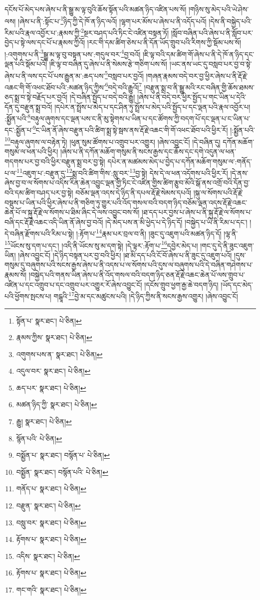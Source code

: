 དངོས་པོ་མེད་པས་ཞེས་པ་ནི་སྒྱུ་མ་ལྟ་བུའི་ཆོས་སྟོན་པའི་མཚན་ཉིད་འཛིན་པས་སོ། །གཉིས་སུ་མེད་པའི་ཡེ་ཤེས་ལས། །ཞེས་པ་ནི་:སྟོང་པ་\footnote{སྟོན་པ་  སྣར་ཐང་།  པེ་ཅིན། }ཉིད་ཀྱི་དེ་ཁོ་ན་ཉིད་ལའོ། །ལྷག་པར་མོས་པ་ཞེས་པ་ནི་འདོད་པའོ། །དེས་ནི་བསྐྱེད་པའི་རིམ་པའི་རྣལ་འབྱོར་པ་:རྣམས་ཀྱི་\footnote{རྣམས་ཀྱིས་  སྣར་ཐང་།  པེ་ཅིན། }སྔར་བཤད་པའི་ཏིང་ངེ་འཛིན་བསྟན་ཏོ། །སློབ་བཞིན་པའི་ཞེས་པ་ནི་སློབ་པར་བྱེད་པ་སྟེ་ལས་དང་པོ་པ་རྣམས་ཀྱིའོ། །རང་གི་དམ་ཚིག་ཅེས་པ་ནི་དོན་ཡོད་གྲུབ་པའི་རིགས་ཀྱི་སྡོམ་པས་སོ། །:འགུགས་པ་ནི་\footnote{འགུགས་པས་ན་  སྣར་ཐང་།  པེ་ཅིན། }སྒྱུ་མ་ལྟ་བུ་བསྟན་པས་:གདུལ་བར་\footnote{འདུལ་བར་  སྣར་ཐང་།  པེ་ཅིན། }བྱ་བའོ། །ཇི་ལྟ་བའི་དམ་ཚིག་གོ་ཞེས་པ་ནི་དེ་ཁོ་ན་ཉིད་དང་ལྡན་པའི་སྡོམ་པའོ། །ཇི་ལྟ་བ་བཞིན་དུ་ཞེས་པ་ནི་སེམས་རྩེ་གཅིག་པས་སོ། །ཡང་ནས་ཡང་དུ་བསླབ་པར་བྱ་བ་སྟེ་ཞེས་པ་ནི་ལས་དང་པོ་པས་རྒྱུན་མ་:ཆད་པས་\footnote{ཆད་པར་  སྣར་ཐང་།  པེ་ཅིན། }བསླབ་པར་བྱའོ། །གཞན་རྣམས་བདེ་བར་བྱ་ཕྱིར་ཞེས་པ་ནི་རྡོ་རྗེ་འཆང་གི་གོ་འཕང་ཐོབ་པའི་:མཚན་ཉིད་ཀྱིས་\footnote{མཚན་ཉིད་ཀྱི་  སྣར་ཐང་།  པེ་ཅིན། }བདེ་བའི་རྒྱུའོ།\footnote{རྒྱུ།  སྣར་ཐང་།  པེ་ཅིན། } །བརྫུན་སྨྲ་བ་ནི་སྒྱུ་མའི་རང་བཞིན་གྱི་ཆོས་ཐམས་ཅད་སྨྲ་བ་སྟེ་བརྗོད་པར་བྱའོ། །དེ་བཞིན་སྤྱོད་པ་བདེ་བའི་རྒྱུ། །ཞེས་པ་ནི་བདེ་བར་ཕྱིར་སྤྱོད་པ་གང་ཡིན་པ་དེའི་དོན་དུ་བརྫུན་སྨྲ་བའོ། །དཔེར་ན་སྤྲོས་པ་མེད་པ་དང་ཤིན་ཏུ་སྤྲོས་པ་མེད་པའི་སྤྱོད་པ་དང་ལྡན་པའི་རྣལ་འབྱོར་པ། :སྨྱོན་པའི་\footnote{སྙོན་པའི་  པེ་ཅིན། }བརྟུལ་ཞུགས་དང་ལྡན་པས་ང་ནི་མུ་སྟེགས་པ་ཡིན་པ་དང་ཚོགས་ཀྱི་བདག་པོ་དང་ལྡན་པ་ང་ཡིན་པ་དང་:སྨྱོན་པ་\footnote{བསྨྱོན་པ་  སྣར་ཐང་། བསྙོན་པ་  པེ་ཅིན། }ང་ཡིན་ནོ་ཞེས་བརྫུན་པའི་ཚིག་སྨྲ་སྟེ་སྦས་ནས་རྡོ་རྗེ་འཆང་གི་གོ་འཕང་ཐོབ་པའི་ཕྱིར་རོ། །:སྨྱོན་པའི་\footnote{བསྨྱོན་  སྣར་ཐང་། བསྙོན་པའི་  པེ་ཅིན། }བརྟུལ་ཞུགས་ལ་བརྟེན་ཏེ། །ཕུན་སུམ་ཚོགས་པ་འགྲུབ་པར་འགྱུར། །ཞེས་འབྱུང་ངོ། །དེ་བཞིན་དུ། དཀོན་མཆོག་གསུམ་ལ་ཕན་པའི་ཕྱིར། །ཞེས་པ་ནི་དཀོན་མཆོག་གསུམ་ནི་སངས་རྒྱས་དང་ཆོས་དང་དགེ་འདུན་ལ་ཕན་གདགས་པར་བྱ་བའི་ཕྱིར་བརྫུན་སྨྲ་བར་བྱ་སྟེ། དཔེར་ན་མཚམས་མེད་པ་བྱེད་པ་དཀོན་མཆོག་གསུམ་ལ་:གནོད་པ་ལ་\footnote{གནོད་པ་  སྣར་ཐང་།  པེ་ཅིན། }འཇུག་པ་:བརྫུན་དུ་\footnote{བརྫུན་  སྣར་ཐང་།  པེ་ཅིན། }སྨྲ་བའི་ཚིག་གིས་:སླུ་བར་\footnote{བསླུ་བར་  སྣར་ཐང་།  པེ་ཅིན། }བྱ་སྟེ། དེས་དེ་ལ་ཕན་འདོགས་པའི་ཕྱིར་རོ། །དེ་ནས་ཞེས་བྱ་བ་ལ་སོགས་པ་འདིས་རིན་ཆེན་འབྱུང་ལྡན་གྱི་ཏིང་ངེ་འཛིན་གྱིས་ཚིག་རྩུབ་མོའི་སྒོ་ནས་འགྲོ་བའི་དོན་བྱ་བའི་དམ་ཚིག་བཤད་པར་བྱ་སྟེ། བཅོམ་ལྡན་འདས་དེ་ཉིད་ནི་དཔལ་རྡོ་རྗེ་སེམས་དཔའོ། །སྐུ་ལ་སོགས་པའི་རྡོ་རྗེ་བསྡུས་པ་ཡིན་པའི་ཕྱིར་ཞེས་པ་ནི་གཅིག་ཏུ་གྱུར་པའི་འོད་གསལ་བའི་བདག་ཉིད་བཅོམ་ལྡན་འདས་རྡོ་རྗེ་འཆང་ཆེན་པོ་ལ་སྐུ་རྡོ་རྗེ་ལ་སོགས་པ་ཐིམ་ཞིང་དེ་ལས་འབྱུང་བས་སོ། །ཐ་དད་པར་བྱས་པ་ཞེས་པ་ནི་སྐུ་རྡོ་རྗེ་ལ་སོགས་པ་བཞི་དང་རྡོ་རྗེ་འཆང་འདི་ཡིན་ནོ་ཞེས་བྱ་བའོ། །དེ་མེད་པས་ན་མི་ཕྱེད་པ་དེ་ཉིད་དོ། །བསྐྱེད་པ་ཡི་ནི་རིམ་པ་དང་། །དེ་བཞིན་རྫོགས་པའི་རིམ་པ་སྟེ། །:རྟོག་པ་\footnote{རྟོགས་པ་  སྣར་ཐང་།  པེ་ཅིན། }རྣམ་པར་བྲལ་བ་ནི། །ཟུང་དུ་འཇུག་པའི་མཚན་ཉིད་དོ། །ལྷ་ནི་\footnote{འདིས་  སྣར་ཐང་།  པེ་ཅིན། }ཡོངས་སུ་དག་པ་དང་། །འདི་ནི་ཡོངས་སུ་མ་དག་སྟེ། །དེ་ལྟར་:རྟོག་པ་\footnote{རྟོགས་པ་  སྣར་ཐང་།  པེ་ཅིན། }དབྱེར་མེད་པ། །གང་དུ་དེ་ནི་ཟུང་འཇུག་ཡིན། །ཞེས་འབྱུང་ངོ། །དེ་ཉིད་བསྟན་པར་བྱ་བའི་ཕྱིར། །ཐ་མི་དད་པའི་ངོ་བོ་ཞེས་པ་ནི་ཟུང་དུ་འཇུག་པའོ། །དུས་གསུམ་དུ་བཞུགས་པའི་སངས་རྒྱས་ཞེས་པ་ནི་འདས་པ་ལ་སོགས་པའི་དུས་ལ་བཞུགས་པའི་དེ་བཞིན་གཤེགས་པ་རྣམས་སོ། །བསྐྱེད་པའི་གནས་ཡིན་ཞེས་པ་ནི་འོད་གསལ་བའི་བདག་ཉིད་ཅན་རྡོ་རྗེ་འཆང་ཆེན་པོ་ལས་གྲུབ་པ་འཛིན་པ་དང་འགྲུབ་པ་དང་འགྲུབ་པར་འགྱུར་རོ་ཞེས་འབྱུང་ངོ། །དངོས་གྲུབ་ཕྱག་རྒྱ་ཆེ་བདག་ཉིད། །ཡོད་དང་མེད་པའི་ཕྱོགས་སྤངས་པ། གངྒཱའི་\footnote{གང་གའི་  སྣར་ཐང་།  པེ་ཅིན། }བྱེ་མ་དང་མཚུངས་པའི། །དེ་ཉིད་ཀྱིས་ནི་སངས་རྒྱས་འགྱུར། །ཞེས་འབྱུང་ངོ། 